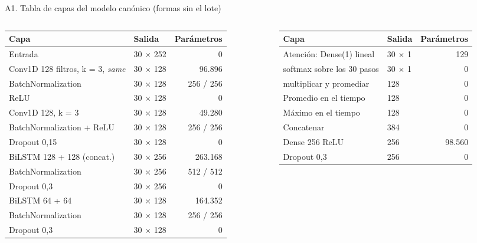 \documentclass[aspectratio=169,10pt,xcolor={table}]{beamer}
\begin{document}
\begin{frame}{A1. Tabla de capas del modelo canónico (formas sin el lote)}\label{fr:capas}
\fontsize{6.8}{8}\selectfont
\renewcommand{\arraystretch}{1.02}
\begin{columns}[T]
\begin{column}{0.5\textwidth}
\begin{tabular}{@{}l l r@{}}
\toprule
Capa & Salida & Parámetros \\
\midrule
Entrada & 30 $\times$ 252 & 0 \\
Conv1D 128 filtros, k = 3, \emph{same} & 30 $\times$ 128 & 96.896 \\
BatchNormalization & 30 $\times$ 128 & 256 / 256 \\
ReLU & 30 $\times$ 128 & 0 \\
Conv1D 128, k = 3 & 30 $\times$ 128 & 49.280 \\
BatchNormalization + ReLU & 30 $\times$ 128 & 256 / 256 \\
Dropout 0,15 & 30 $\times$ 128 & 0 \\
BiLSTM 128 + 128 (concat.) & 30 $\times$ 256 & 263.168 \\
BatchNormalization & 30 $\times$ 256 & 512 / 512 \\
Dropout 0,3 & 30 $\times$ 256 & 0 \\
BiLSTM 64 + 64 & 30 $\times$ 128 & 164.352 \\
BatchNormalization & 30 $\times$ 128 & 256 / 256 \\
Dropout 0,3 & 30 $\times$ 128 & 0 \\
\bottomrule
\end{tabular}
\end{column}
\begin{column}{0.48\textwidth}
\begin{tabular}{@{}l l r@{}}
\toprule
Capa & Salida & Parámetros \\
\midrule
Atención: Dense(1) lineal & 30 $\times$ 1 & 129 \\
\quad softmax sobre los 30 pasos & 30 $\times$ 1 & 0 \\
\quad multiplicar y promediar & 128 & 0 \\
Promedio en el tiempo & 128 & 0 \\
Máximo en el tiempo & 128 & 0 \\
Concatenar & 384 & 0 \\
Dense 256 ReLU & 256 & 98.560 \\
Dropout 0,3 & 256 & 0 \\

\end{tabular}
\end{column}
\end{columns}
\end{frame}
\end{document}
